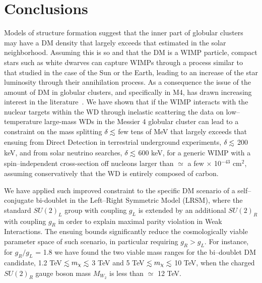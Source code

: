 \documentclass[11pt]{article}
\newcommand{\lsim}{\mathrel{\mathop{\kern 0pt \rlap
      {\raise.2ex\hbox{$<$}}}\lower.9ex\hbox{\kern-.190em $ \sim$}}}
\begin{document}
\section{Conclusions}
\label{sec:conclusions}

Models of structure formation suggest that the inner part of globular clusters may have a DM density that largely exceeds that estimated in the solar neighborhood. Assuming this is so and that the DM is a WIMP particle, compact stars such as white dwarves can capture WIMPs through a process similar to that studied in the case of the Sun or the Earth, leading to an increase of the star luminosity through their annihilation process.  As a consequence the issue of the amount of DM in globular clusters, and specifically in M4, has drawn increasing interest in the literature~\cite{idm_wd_2010, dm_cap_WD_Dasgupta2019, improved_WD_2021}.  We have shown that if the WIMP interacts with the nuclear targets within the WD through inelastic scattering the data on low--temperature large-mass WDs in the Messier 4 globular cluster can lead to a constraint on the mass splitting $\delta\lsim$ few tens of MeV that largely exceeds that ensuing from Direct Detection in terrestrial underground experiments, $\delta\lsim$ 200 keV, and from solar neutrino searches, $\delta\lsim$ 600 keV, for a generic WIMP with a spin--independent cross-section off nucleons larger than $\simeq$ a few $\times$ 10$^{-43}$ cm$^2$, assuming conservatively that the WD is entirely composed of carbon.

 We have applied such improved constraint to the specific DM scenario of a self--conjugate bi-doublet in the Left--Right Symmetric Model (LRSM), where the standard $SU(2)_L$ group with coupling $g_L$ is extended by an additional $SU(2)_R$ with coupling $g_R$ in order to explain maximal parity violation in Weak Interactions. The ensuing bounds significantly reduce the cosmologically viable parameter space of such scenario, in particular requiring $g_R>g_L$. For instance, for $g_R/g_L$ = 1.8 we have found the two viable mass ranges for the bi--doublet DM candidate, 1.2 TeV $\lsim m_\chi\lsim$ 3 TeV and 5 TeV $\lsim m_\chi\lsim$ 10 TeV, when the charged $SU(2)_R$ gauge boson mass $M_{W_2}$ is less than $\simeq$ 12 TeV. 
 
\end{document}

